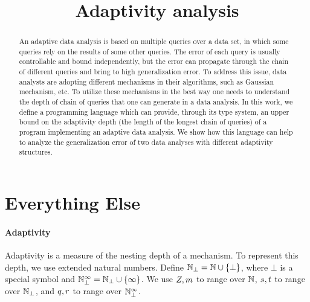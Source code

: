 \documentclass[a4paper,11pt]{article}
\title{Adaptivity analysis}
\author{}
\date{}
\theoremstyle{definition}
\begin{document}
\maketitle

\begin{abstract}
An adaptive data analysis is based on multiple queries over a data set, in which some queries rely on the results of some other queries. The error of each query is usually controllable and bound independently, but the error can propagate through the chain of different queries and bring to high generalization error. To address this issue, data analysts are adopting different mechanisms in their algorithms, such as Gaussian mechanism, etc. To utilize these mechanisms in the best way one needs to understand the depth of chain of queries that one can generate in a data analysis. In this work, we define a programming language which can provide, through its type system, an upper bound on the adaptivity  depth (the length of the longest chain of queries) of a program implementing an adaptive data analysis. We show how this language can help to analyze the generalization error of two data analyses with different adaptivity structures.
\end{abstract}



\section{Everything Else}

\paragraph{Adaptivity}
Adaptivity is a measure of the nesting depth of a mechanism. To
represent this depth, we use extended natural numbers. Define $\mathbb{N}_{\bot} =
\mathbb{N} \cup \{\bot\}$, where $\bot$ is a special symbol and $\mathbb{N}_{\bot}^\infty =
\mathbb{N}_{\bot} \cup \{\infty\}$. We use $Z, m$ to range over $\mathbb{N}$,
$s, t$ to range over $\mathbb{N}_{\bot}$, and $q, r$ to
range over $\mathbb{N}_{\bot}^\infty$.
\end{document}

